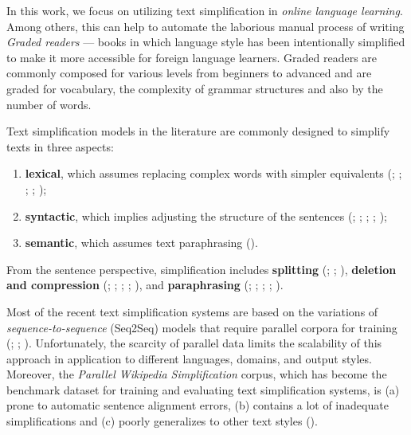 In this work, we focus on utilizing text simplification in \emph{online language learning}. Among others, this can help to automate the laborious manual process of writing \emph{Graded readers} --- books in which language style has been intentionally simplified to make it more accessible for foreign language learners. Graded readers are commonly composed for various levels from beginners to advanced and are graded for vocabulary, the complexity of grammar structures and also by the number of words. 

Text simplification models in the literature are commonly designed to simplify texts in three aspects: 

\begin{enumerate}
    \item \textbf{lexical}, which assumes replacing complex words with simpler equivalents (\cite{Candido:2009:SAT:1609843.1609848}; \cite{glavas-stajner-2015-simplifying}; \cite{yatskar-etal-2010-sake}; \cite{biran-etal-2011-putting}; \cite{Devlin1998TheUO});
    \item \textbf{syntactic}, which implies adjusting the structure of the sentences (\cite{Siddharthan2006}; \cite{filippova-strube-2008-dependency}; \cite{brouwers-etal-2014-syntactic}; \cite{DBLP:journals/kbs/ChandrasekarS97}; \cite{canning-simplification-of-newspaper-text});
    \item \textbf{semantic}, which assumes text paraphrasing (\cite{kandula-health-content}).
\end{enumerate}

From the sentence perspective, simplification includes \textbf{splitting} (\cite{Siddharthan2006}; \cite{Petersen2007TextSF}; \cite{narayan-gardent-2014-hybrid}), \textbf{deletion and compression} (\cite{rush-etal-2015-neural}; \cite{Clarke:2006:MSC:1220175.1220223}; \cite{filippova-strube-2008-dependency}; \cite{filippova-etal-2015-sentence}; \cite{Knight02summarizationbeyond}), and \textbf{paraphrasing} (\cite{wubben-etal-2012-sentence}; \cite{nisioi-etal-2017-exploring}; \cite{Specia:2010:TCS:2128464.2128471}; \cite{Wang:2016:TSU:3016387.3016551}; \cite{coster-kauchak-2011-simple}).

Most of the recent text simplification systems are based on the variations of \emph{sequence-to-sequence} (Seq2Seq) models that require parallel corpora for training (\cite{kajiwara-komachi-2016-building}; \cite{scarton-etal-2018-text}; \cite{zhang-lapata-2017-sentence}). Unfortunately, the scarcity of parallel data limits the scalability of this approach in application to different languages, domains, and output styles. Moreover, the \emph{Parallel Wikipedia Simplification} corpus, which has become the benchmark dataset for training and evaluating text simplification systems, is (a) prone to automatic sentence alignment errors, (b) contains a lot of inadequate simplifications and (c) poorly generalizes to other text styles (\cite{xu-etal-2015-problems}). 

